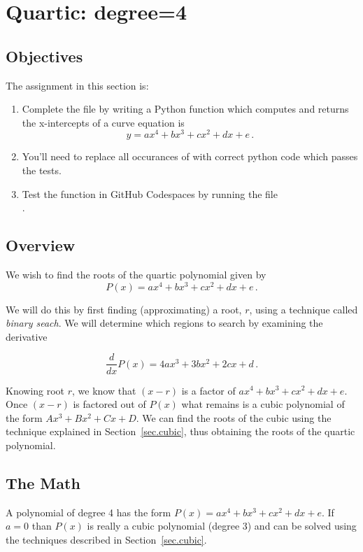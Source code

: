 \section{Quartic: degree=4}
\label{sec.quartic}

\subsection{Objectives}
The assignment in this section is:
\begin{enumerate}
\item Complete the file  by writing a Python
  function which computes and returns the x-intercepts of a curve
  equation is \[y=a x^4 + b x^3 + c x^2 + d x + e\,.\]
\item You'll need to replace all occurances of 
  with correct python code which passes the tests.
\item Test the function in GitHub Codespaces by running the file\\
  .
\end{enumerate}

\subsection{Overview}

We wish to find the roots of the quartic polynomial given by 
\[P(x) = ax^4 + b x^3 + c x^2 + d x + e\,.\]

We will do this by first finding
(approximating) a root, $r$, using a technique called \emph{binary
seach}.  We will determine which regions to search by examining the derivative

\[\frac{d}{dx} P(x) = 4ax^3 + 3b x^2 + 2c x + d\,.\]

Knowing root $r$, we know that $(x-r)$ is a factor of 
$a x^4 + b x^3 + c x^2 + d x + e$.  Once $(x-r)$ is factored out of $P(x)$
what remains is a cubic polynomial of the form $A x^3 + B x^2 + C x + D$.
We can find the roots of the cubic using the technique
explained in Section~\ref{sec.cubic}, thus obtaining the roots of
the quartic polynomial.


\subsection{The Math}


A polynomial of degree 4 has the form $P(x) = a x^4 + b x^3 + c x^2 + d x + e$. If $a=0$ than $P(x)$ is really
a cubic polynomial (degree 3) and can be solved using the techniques described in Section~\ref{sec.cubic}.

